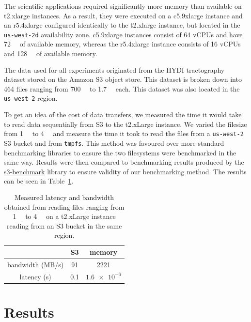 The scientific applications required significantly more memory than available on t2.xlarge instances. As a result, they were executed on a c5.9xlarge instance and an r5.4xlarge configured identically
to the t2.xlarge instance, but located in the \texttt{us-west-2d} availability zone. c5.9xlarge instances consist of 64 vCPUs and have \SI{72}{\gibi\byte} of available memory, whereas the r5.4xlarge instance consists of 16 vCPUs and \SI{128}{\gibi\byte} of available memory. 

The data used for all experiments originated from the HYDI tractography dataset stored on the Amazon S3 object store. 
This dataset is broken down into 464 files ranging from \SI{700}{\mebi\byte} to \SI{1.7}{\gibi\byte} each. This dataset
was also located in the \texttt{us-west-2} region.

To get an idea of the cost of data transfers, we measured the time it would take to read data sequentially from S3 to the t2.xLarge instance. We varied the filesize from \SI{1}{\kibi\byte} to \SI{4}{\gibi\byte} and measure the time it took to read the files from
a \texttt{us-west-2} S3 bucket and from \texttt{tmpfs}. This method was favoured over more standard benchmarking libraries to ensure the
two filesystems were benchmarked in the same way. Results were then compared to benchmarking results produced by
the \href{https://github.com/dvassallo/s3-benchmark}{s3-benchmark} library to ensure validity of our benchmarking
method. The results can be seen in Table~\ref{table:benchmarks}.


\begin{table}
\caption{Measured latency and bandwidth obtained from reading files ranging from \SI{1}{\kibi\byte} to \SI{4}{\gibi\byte} on a t2.xLarge instance reading from an S3 bucket in the same region.}
\centering
\begin{tabular}{| c | c | c| }
\cline{2-3}
  \multicolumn{1}{c|}{}& S3 & memory \\ 
  \hline
 bandwidth (MB/s) & 91 & 2221 \\  
 latency (s) & 0.1 & $\num{1.6e-6}$ \\
 \hline
\end{tabular}
\label{table:benchmarks}
\end{table}


\section{Results}
